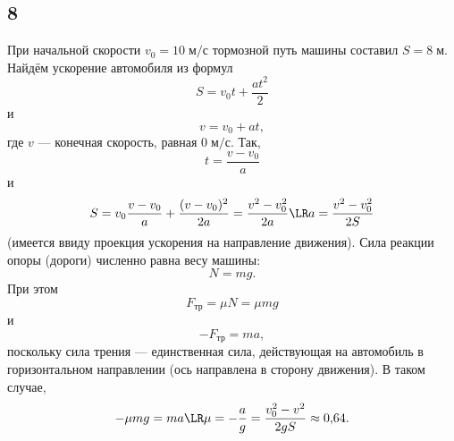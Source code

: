 \subsection{8}

При начальной скорости $v_0=10\;\text{м/с}$ тормозной путь машины составил $S=8\;\text{м}$. Найдём ускорение автомобиля из формул
\[
S=v_0t+\frac{at^2}{2}
\]
и
\[
v=v_0+at,
\]
где $v$ --- конечная скорость, равная $0\;\text{м/с}$. Так,
\[
t=\frac{v-v_0}{a}
\]
и
\[
S=v_0\frac{v-v_0}{a}+\frac{(v-v_0)^2}{2a}=\frac{v^2-v_0^2}{2a}\LR a=\frac{v^2-v_0^2}{2S}
\]
(имеется ввиду проекция ускорения на направление движения). Сила реакции опоры (дороги) численно равна весу машины:
\[
N=mg.
\]
При этом
\[
F_\text{тр}=\mu N=\mu mg
\]
и
\[
-F_\text{тр}=ma,
\]
поскольку сила трения --- единственная сила, действующая на автомобиль в горизонтальном направлении (ось направлена в сторону движения). В таком случае,
\[
-\mu mg=ma\LR\mu=-\frac{a}{g}=\frac{v_0^2-v^2}{2gS}\approx0{,}64.
\]